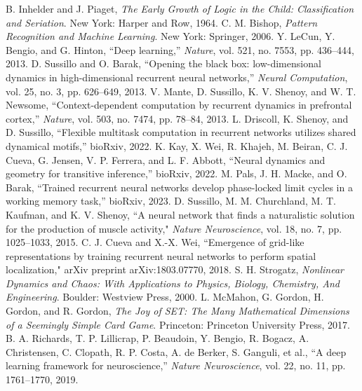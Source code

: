 \documentclass[conference]{IEEEtran}
\begin{document}
\begin{thebibliography}{00}
 B. Inhelder and J. Piaget, \textit{The Early Growth of Logic in the Child: Classification and Seriation}. New York: Harper and Row, 1964.
 C. M. Bishop, \textit{Pattern Recognition and Machine Learning}. New York: Springer, 2006.
 Y. LeCun, Y. Bengio, and G. Hinton, ``Deep learning,'' \textit{Nature}, vol. 521, no. 7553, pp. 436--444, 2013.
 D. Sussillo and O. Barak, ``Opening the black box: low-dimensional dynamics in high-dimensional recurrent neural networks,'' \textit{Neural Computation}, vol. 25, no. 3, pp. 626--649, 2013.
 V. Mante, D. Sussillo, K. V. Shenoy, and W. T. Newsome, ``Context-dependent computation by recurrent dynamics in prefrontal cortex,'' \textit{Nature}, vol. 503, no. 7474, pp. 78--84, 2013.
 L. Driscoll, K. Shenoy, and D. Sussillo, ``Flexible multitask computation in recurrent networks utilizes shared dynamical motifs,'' bioRxiv, 2022.
 K. Kay, X. Wei, R. Khajeh, M. Beiran, C. J. Cueva, G. Jensen, V. P. Ferrera, and L. F. Abbott, ``Neural dynamics and geometry for transitive inference,'' bioRxiv, 2022.
 M. Pals, J. H. Macke, and O. Barak, ``Trained recurrent neural networks develop phase-locked limit cycles in a working memory task,'' bioRxiv, 2023.
 D. Sussillo, M. M. Churchland, M. T. Kaufman, and K. V. Shenoy, ``A neural network that finds a naturalistic solution for the production of muscle activity," \textit{Nature Neuroscience}, vol. 18, no. 7, pp. 1025--1033, 2015.
 C. J. Cueva and X.-X. Wei, ``Emergence of grid-like representations by training recurrent neural networks to perform spatial localization," arXiv preprint arXiv:1803.07770, 2018.
 S. H. Strogatz, \textit{Nonlinear Dynamics and Chaos: With Applications to Physics, Biology, Chemistry, And Engineering}. Boulder: Westview Press, 2000.
 L. McMahon, G. Gordon, H. Gordon, and R. Gordon, \textit{The Joy of SET: The Many Mathematical Dimensions of a Seemingly Simple Card Game}. Princeton: Princeton University Press, 2017.
 B. A. Richards, T. P. Lillicrap, P. Beaudoin, Y. Bengio, R. Bogacz, A. Christensen, C. Clopath, R. P. Costa, A. de Berker, S. Ganguli, et al., ``A deep learning framework for neuroscience,'' \textit{Nature Neuroscience}, vol. 22, no. 11, pp. 1761--1770, 2019.

\end{thebibliography}
\end{document}
